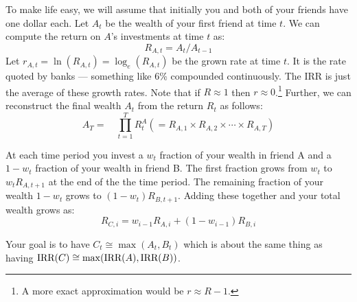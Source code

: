 \documentclass{book}
\begin{document}
To make life easy, we will assume that initially you and both of
your friends have one dollar each.  Let $A_t$ be the wealth of your
first friend at time $t$.  We can compute the return on $A$'s
investments at time $t$ as:
\begin{displaymath}
R_{A,t} = A_t/A_{t-1}
\end{displaymath}
Let $r_{A,t} = \ln(R_{A,t}) = \log_e(R_{A,t})$ be the grown rate at time $t$.  It
is the rate quoted by banks --- something like 6\% compounded
continuously.  The IRR is just the average of these growth rates.
Note that if $R \approx 1 $ then $r \approx 0$.\footnote{A more exact
  approximation would be $r \approx R -1$.}  Further, we can
reconstruct the final wealth $A_t$ from the return $R_t$ as follows:
\begin{displaymath}
A_T =  \quad \prod_{t=1}^{T} R^A_t \left(= R_{A,1} \times R_{A,2}
\times \cdots \times R_{A,T} \right)
\label{def:product}
\end{displaymath}

At each time period you invest a $w_{t}$ fraction of your
wealth in friend A and a $1-w_{t}$ fraction of your wealth in friend B.
The first fraction grows from $w_t$ to $w_t R_{A,t+1}$ at the end of
the the time period.  The remaining fraction of your wealth $1-w_t$
grows to $(1-w_t)R_{B,t+1}$.  Adding these together and your total
wealth grows as: 
\begin{displaymath}
R_{C,i}  =  w_{i-1} R_{A,i} + (1-w_{i-1}) R_{B,i}
\end{displaymath}


Your goal is to have $C_{t}\cong  \max(A_{t},B_{t})$ which is about
the same thing as having $\hbox{IRR}(C) \cong
\max(\hbox{IRR}(A),\hbox{IRR}(B)) $.
\end{document}
